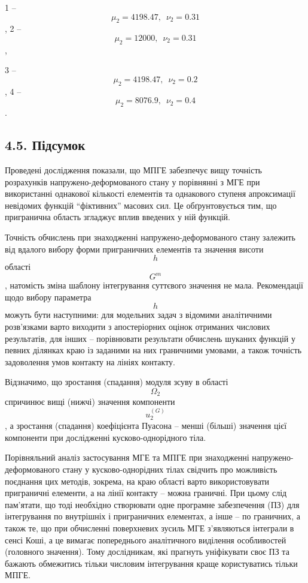 1 --
\[{{\mu_{2} = \text{4198}}\text{.}\text{47},\mspace{9mu}{\nu_{2} = 0}\text{.}\text{31}}{}\],
2 --
\[{{\mu_{2} = \text{12000}},\mspace{9mu}{\nu_{2} = 0}\text{.}\text{31}}{}\],

3
--\[{{\mu_{2} = \text{4198}}\text{.}\text{47},\mspace{9mu}{\nu_{2} = 0}\text{.}2}{}\],
4 --
\[{{\mu_{2} = \text{8076}}\text{.}9,\mspace{9mu}{\nu_{2} = 0}\text{.}4}{}\].

\hypertarget{ux43fux456ux434ux441ux443ux43cux43eux43a-2}{%
\subsection[4.5.
Підсумок]{\texorpdfstring{\protect\hypertarget{anchor-59}{}{}4.5.
Підсумок}{4.5. Підсумок}}\label{ux43fux456ux434ux441ux443ux43cux43eux43a-2}}

Проведені дослідження показали, що МПГЕ забезпечує вищу\emph{ }точність
розрахунків напружено-деформованого стану у порівнянні з МГЕ при
використанні однакової кількості елементів та однакового ступеня
апроксимації невідомих функцій ``фіктивних'' масових сил. Це
обґрунто­вується тим, що пригранична область згладжує вплив введених у
ній функцій.

Точність обчислень при знаходженні напружено-деформованого стану
залежить від вдалого вибору форми приграничних елементів та значення
висоти \[h{}\] області \[G^{m}{}\], натомість зміна шаблону інтегрування
суттєвого значення не мала. Рекомендації щодо вибору параметра \[h{}\]
можуть бути наступними: для модельних задач з відомими аналітичними
розв'язками варто виходити з апостеріорних оцінок отриманих числових
результатів, для інших -- порівнювати результати обчислень шуканих
функцій у певних ділянках краю із заданими на них граничними умовами, а
також точність задоволення умов контакту на лініях контакту.

Відзначимо, що зростання (спадання) модуля зсуву в області
\[\Omega_{2}{}\] спричинює вищі (нижчі) значення компоненти
\[u_{2}^{(G)}{}\], а зростання (спадання) коефіцієнта Пуасона -- менші
(більші) значення цієї компоненти при дослідженні кусково-однорідного
тіла.

Порівняльний аналіз застосування МГЕ та МПГЕ при знаходженні
напружено-деформованого стану у кусково-однорідних тілах свідчить про
можливість поєднання цих методів, зокрема, на краю області варто
використовувати приграничні елементи, а на лінії контакту -- можна
граничні. При цьому слід пам'ятати, що тоді необхідно створювати одне
програмне забезпечення (ПЗ) для інтегрування по внутрішніх і
приграничних елементах, а інше -- по граничних, а також те, що при
обчисленні поверхневих зусиль МГЕ з'являються інтеграли в сенсі Коші, а
це вимагає попереднього аналітичного виділення особливостей (головного
значення). Тому дослідникам, які прагнуть уніфікувати своє ПЗ та бажають
обмежитись тільки числовим інтегрування краще користуватись тільки МПГЕ.

